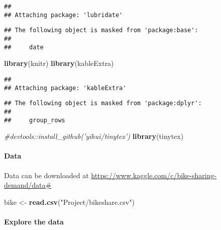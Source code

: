 \documentclass[]{article}
\newenvironment{Shaded}{\begin{snugshade}}{\end{snugshade}}
\newcommand{\KeywordTok}[1]{\textcolor[rgb]{0.13,0.29,0.53}{\textbf{#1}}}
\newcommand{\StringTok}[1]{\textcolor[rgb]{0.31,0.60,0.02}{#1}}
\newcommand{\CommentTok}[1]{\textcolor[rgb]{0.56,0.35,0.01}{\textit{#1}}}
\newcommand{\OperatorTok}[1]{\textcolor[rgb]{0.81,0.36,0.00}{\textbf{#1}}}
\newcommand{\NormalTok}[1]{#1}
\let\oldparagraph\paragraph
\renewcommand{\paragraph}[1]{\oldparagraph{#1}\mbox{}}
\begin{document}
\begin{verbatim}
## 
## Attaching package: 'lubridate'
\end{verbatim}

\begin{verbatim}
## The following object is masked from 'package:base':
## 
##     date
\end{verbatim}

\begin{Shaded}
\begin{Highlighting}[]
\KeywordTok{library}\NormalTok{(knitr)}
\KeywordTok{library}\NormalTok{(kableExtra)}
\end{Highlighting}
\end{Shaded}

\begin{verbatim}
## 
## Attaching package: 'kableExtra'
\end{verbatim}

\begin{verbatim}
## The following object is masked from 'package:dplyr':
## 
##     group_rows
\end{verbatim}

\begin{Shaded}
\begin{Highlighting}[]
\CommentTok{#devtools::install_github('yihui/tinytex')}
\KeywordTok{library}\NormalTok{(tinytex)}
\end{Highlighting}
\end{Shaded}

\paragraph{Data}\label{data}

Data can be downloaded at
\url{https://www.kaggle.com/c/bike-sharing-demand/data\#}

\begin{Shaded}
\begin{Highlighting}[]
\NormalTok{bike <-}\StringTok{  }\KeywordTok{read.csv}\NormalTok{(}\StringTok{"Project/bikeshare.csv"}\NormalTok{)}
\end{Highlighting}
\end{Shaded}

\paragraph{Explore the data}\label{explore-the-data}

\begin{Shaded}
\end{Shaded}
\end{document}
